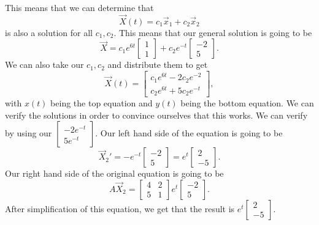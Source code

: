 This means that we can determine that \[
  \vec{X}(t)=c_1\vec{x}_1+c_2\vec{x}_2
\] is also a solution for all $c_1,c_2$. This means that our general solution is going to be \[
\vec{X}=c_1e^{6t}\begin{bmatrix} 1\\1 \end{bmatrix} +c_2e^{-t}\begin{bmatrix} -2\\5 \end{bmatrix} 
.\] We can also take our $c_1,c_2$ and distribute them to get \[
\vec{X}(t)=\begin{bmatrix} c_1e^{6t}-2c_2e^{-2}\\c_2e^{6t}+5c_2e^{-t} \end{bmatrix} 
,\] with $x(t)$ being the top equation and $y(t)$ being the bottom equation. We can verify the solutions in order to convince ourselves that this works. We can verify by using our $\begin{bmatrix} -2e^{-t}\\5e^{-t} \end{bmatrix} $. Our left hand side of the equation is going to be \[
\vec{X}_2'=-e^{-t}\begin{bmatrix} -2\\5 \end{bmatrix} =e^{t}\begin{bmatrix} 2\\-5 \end{bmatrix} 
.\] Our right hand side of the original equation is going to be \[
A\vec{X}_2 = \begin{bmatrix} 4&2\\5&1 \end{bmatrix} e^{t}\begin{bmatrix} -2\\5 \end{bmatrix} 
.\] After simplification of this equation, we get that the result is $e^{t}\begin{bmatrix} 2\\-5 \end{bmatrix} $.
